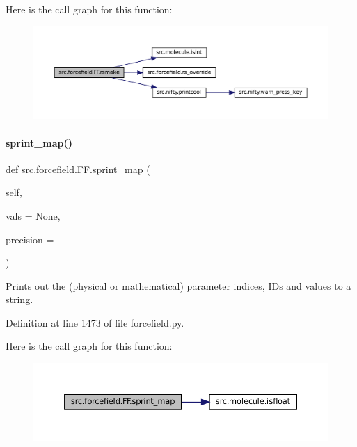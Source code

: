 Here is the call graph for this function\+:
\nopagebreak
\begin{figure}[H]
\begin{center}
\leavevmode
\includegraphics[width=350pt]{classsrc_1_1forcefield_1_1FF_a4524aae9e3644c578766a36f220ef076_cgraph}
\end{center}
\end{figure}
\mbox{\label{classsrc_1_1forcefield_1_1FF_a5118353add1d9fbe1f7865dd9b003727}} 
\paragraph{\texorpdfstring{sprint\+\_\+map()}{sprint\_map()}}
{\footnotesize\ttfamily def src.\+forcefield.\+F\+F.\+sprint\+\_\+map (\begin{DoxyParamCaption}\item[{}]{self,  }\item[{}]{vals = {\ttfamily None},  }\item[{}]{precision = {} }\end{DoxyParamCaption})}



Prints out the (physical or mathematical) parameter indices, I\+Ds and values to a string. 



Definition at line 1473 of file forcefield.\+py.

Here is the call graph for this function\+:
\nopagebreak
\begin{figure}[H]
\begin{center}
\leavevmode
\includegraphics[width=350pt]{classsrc_1_1forcefield_1_1FF_a5118353add1d9fbe1f7865dd9b003727_cgraph}
\end{center}
\end{figure}


